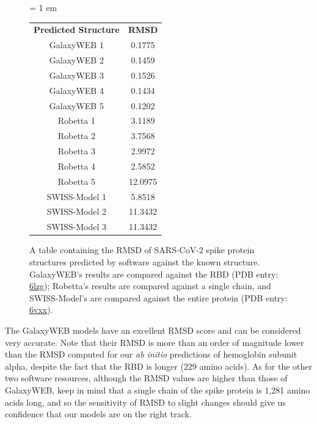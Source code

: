 \begin{figure}[h]
	\centering
	\tabcolsep = 1 em
	\mySfFamily
	\begin{tabular}{c c}
		\textbf{Predicted Structure} & \textbf{RMSD} \\
		GalaxyWEB 1 & \phantom{x}0.1775 \\
		GalaxyWEB 2 & \phantom{x}0.1459 \\
		GalaxyWEB 3 & \phantom{x}0.1526 \\
		GalaxyWEB 4 & \phantom{x}0.1434 \\
		GalaxyWEB 5 & \phantom{x}0.1202 \\
		Robetta 1 & \phantom{x}3.1189 \\
		Robetta 2 & \phantom{x}3.7568 \\
		Robetta 3 & \phantom{x}2.9972 \\
		Robetta 4 & \phantom{x}2.5852 \\
		Robetta 5 & 12.0975 \\
		SWISS-Model 1 & \phantom{x}5.8518 \\
		SWISS-Model 2 & 11.3432 \\
		SWISS-Model 3 & 11.3432 \\
	\end{tabular}
	\caption{A table containing the RMSD of SARS-CoV-2 spike protein structures predicted by software against the known structure. GalaxyWEB's results are compared against the RBD (PDB entry: \href{https://www.rcsb.org/structure/6lzg}{6lzg}); Robetta's results are compared against a single chain, and SWISS-Model's are compared against the entire protein (PDB entry: \href{https://www.rcsb.org/structure/6vxx}{6vxx}).}
	\label{fig:sars-cov-2_rmsd_table}
\end{figure}

The GalaxyWEB models have an excellent RMSD score and can be considered very accurate. Note that their RMSD is more than an order of magnitude lower than the RMSD computed for our \textit{ab initio} predictions of hemoglobin subunit alpha, despite the fact that the RBD is longer (229 amino acids). As for the other two software resources, although the RMSD values are higher than those of GalaxyWEB, keep in mind that a single chain of the spike protein is 1,281 amino acids long, and so the sensitivity of RMSD to slight changes should give us confidence that our models are on the right track.\\

\begin{qbox}\end{qbox}


